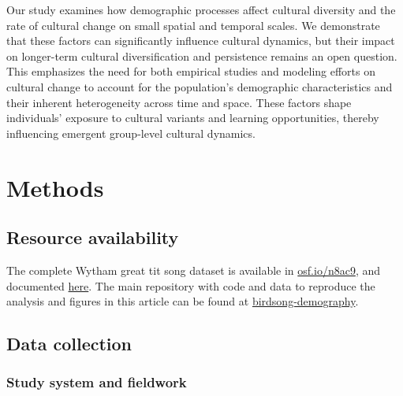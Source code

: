 \documentclass[9pt, onecolumn, twoside, lineno]{gsajnl}
\begin{document}
Our study examines how demographic processes affect cultural diversity and the rate of cultural change on small spatial and temporal scales. We demonstrate that these factors can significantly influence cultural dynamics, but their impact on longer-term cultural diversification and persistence remains an open question. This emphasizes the need for both empirical studies and modeling efforts on cultural change to account for the population's demographic characteristics and their inherent heterogeneity across time and space. These factors shape individuals' exposure to cultural variants and learning opportunities, thereby influencing emergent group-level cultural dynamics.

\section{Methods}
\label{sc:methods}

\subsection{Resource availability}

The complete Wytham great tit song dataset is available in \href{https://osf.io/n8ac9}{osf.io/n8ac9}, and documented \href{https://nilomr.github.io/great-tit-hits/}{here}. The main repository with code and data to reproduce the analysis and figures in this article can be found at \href{http://github.com/nilomr/birdsong-demography}{birdsong-demography}.

\subsection{Data collection}

\subsubsection{Study system and fieldwork}
\end{document}
